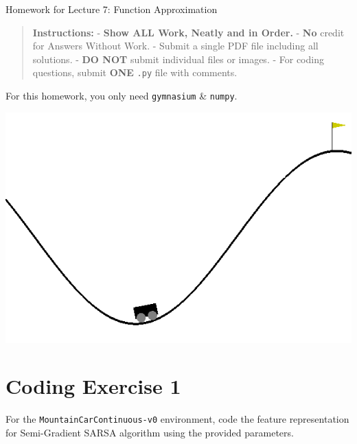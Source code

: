 \documentclass[
  letterpaper,
  DIV=11,
  numbers=noendperiod]{scrreprt}
\begin{document}
\begin{tcolorbox}[enhanced jigsaw, colback=white, left=2mm, breakable, opacityback=0, bottomrule=.15mm, rightrule=.15mm, arc=.35mm, colframe=quarto-callout-note-color-frame, leftrule=.75mm, toprule=.15mm]

Homework for Lecture 7: Function Approximation 📝

\end{tcolorbox}

\begin{quote}
\textbf{Instructions:} - \textbf{Show ALL Work, Neatly and in Order.} -
\textbf{No} credit for Answers Without Work. - Submit a single PDF file
including all solutions. - \textbf{DO NOT} submit individual files or
images. - For coding questions, submit \textbf{ONE} \texttt{.py} file
with comments.
\end{quote}

\begin{tcolorbox}[enhanced jigsaw, opacityback=0, left=2mm, breakable, bottomtitle=1mm, rightrule=.15mm, colframe=quarto-callout-note-color-frame, titlerule=0mm, colback=white, opacitybacktitle=0.6, toptitle=1mm, title=\textcolor{quarto-callout-note-color}{\faInfo}\hspace{0.5em}{Note}, colbacktitle=quarto-callout-note-color!10!white, bottomrule=.15mm, arc=.35mm, coltitle=black, leftrule=.75mm, toprule=.15mm]

For this homework, you only need \texttt{gymnasium} \& \texttt{numpy}.

\end{tcolorbox}

\begin{center}
\includegraphics[width=0.4\linewidth,height=\textheight,keepaspectratio]{homework/images/mountaincar.gif}
\end{center}

\section{Coding Exercise 1}\label{coding-exercise-1-4}

For the \texttt{MountainCarContinuous-v0} environment, code the feature
representation for Semi-Gradient SARSA algorithm using the provided
parameters.
\end{document}

